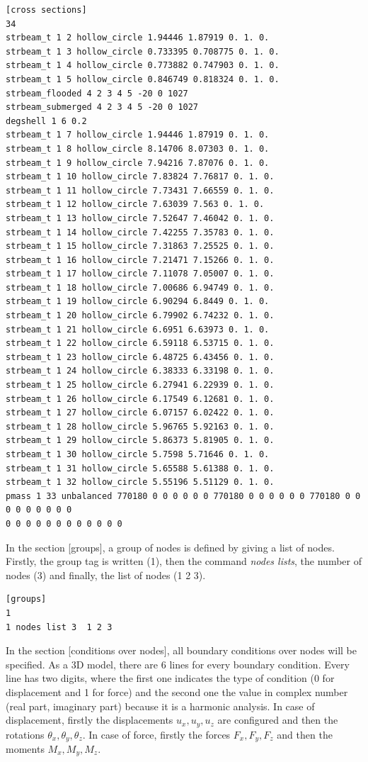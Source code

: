 \documentclass[a4]{article}
\begin{document}
\begin{Verbatim}	
[cross sections]
34
strbeam_t 1 2 hollow_circle 1.94446 1.87919 0. 1. 0.
strbeam_t 1 3 hollow_circle 0.733395 0.708775 0. 1. 0.
strbeam_t 1 4 hollow_circle 0.773882 0.747903 0. 1. 0.
strbeam_t 1 5 hollow_circle 0.846749 0.818324 0. 1. 0.
strbeam_flooded 4 2 3 4 5 -20 0 1027
strbeam_submerged 4 2 3 4 5 -20 0 1027
degshell 1 6 0.2
strbeam_t 1 7 hollow_circle 1.94446 1.87919 0. 1. 0.
strbeam_t 1 8 hollow_circle 8.14706 8.07303 0. 1. 0.
strbeam_t 1 9 hollow_circle 7.94216 7.87076 0. 1. 0.
strbeam_t 1 10 hollow_circle 7.83824 7.76817 0. 1. 0.
strbeam_t 1 11 hollow_circle 7.73431 7.66559 0. 1. 0.
strbeam_t 1 12 hollow_circle 7.63039 7.563 0. 1. 0.
strbeam_t 1 13 hollow_circle 7.52647 7.46042 0. 1. 0.
strbeam_t 1 14 hollow_circle 7.42255 7.35783 0. 1. 0.
strbeam_t 1 15 hollow_circle 7.31863 7.25525 0. 1. 0.
strbeam_t 1 16 hollow_circle 7.21471 7.15266 0. 1. 0.
strbeam_t 1 17 hollow_circle 7.11078 7.05007 0. 1. 0.
strbeam_t 1 18 hollow_circle 7.00686 6.94749 0. 1. 0.
strbeam_t 1 19 hollow_circle 6.90294 6.8449 0. 1. 0.
strbeam_t 1 20 hollow_circle 6.79902 6.74232 0. 1. 0.
strbeam_t 1 21 hollow_circle 6.6951 6.63973 0. 1. 0.
strbeam_t 1 22 hollow_circle 6.59118 6.53715 0. 1. 0.
strbeam_t 1 23 hollow_circle 6.48725 6.43456 0. 1. 0.
strbeam_t 1 24 hollow_circle 6.38333 6.33198 0. 1. 0.
strbeam_t 1 25 hollow_circle 6.27941 6.22939 0. 1. 0.
strbeam_t 1 26 hollow_circle 6.17549 6.12681 0. 1. 0.
strbeam_t 1 27 hollow_circle 6.07157 6.02422 0. 1. 0.
strbeam_t 1 28 hollow_circle 5.96765 5.92163 0. 1. 0.
strbeam_t 1 29 hollow_circle 5.86373 5.81905 0. 1. 0.
strbeam_t 1 30 hollow_circle 5.7598 5.71646 0. 1. 0.
strbeam_t 1 31 hollow_circle 5.65588 5.61388 0. 1. 0.
strbeam_t 1 32 hollow_circle 5.55196 5.51129 0. 1. 0.
pmass 1 33 unbalanced 770180 0 0 0 0 0 0 770180 0 0 0 0 0 0 770180 0 0 0 0 0 0 0 0 0 
0 0 0 0 0 0 0 0 0 0 0 0 
\end{Verbatim}

In the section [groups], a group of nodes is defined by giving a list of nodes. Firstly, the group tag is written (1), then the command \textit{nodes lists}, the number of nodes (3) and finally, the list of nodes (1 2 3).    

\begin{Verbatim}
[groups]
1
1 nodes list 3  1 2 3 
\end{Verbatim}

In the section [conditions over nodes], all boundary conditions over nodes will be specified. As a 3D model, there are 6 lines for every boundary condition. Every line has two digits, where the first one indicates the type of condition (0 for displacement and 1 for force) and the second one the value in complex number (real part, imaginary part) because it is a harmonic analysis. In case of displacement, firstly the displacements $u_x, u_y, u_z$ are configured and then the rotations $\theta_x, \theta_y, \theta_z$. In case of force, firstly the forces $F_x, F_y, F_z$ and then the moments $M_x, M_y, M_z$. 
\end{document}
